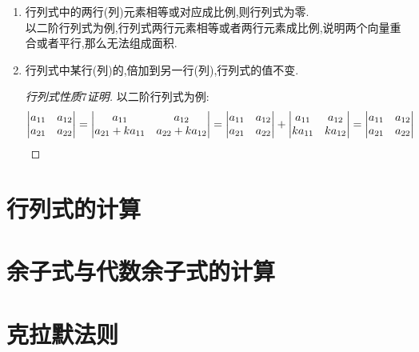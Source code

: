 \documentclass[8pt a4paper, oneside, UTF8]{ctexbook}
\begin{document}
\begin{sloppypar}
\begin{enumerate}
        \item 行列式中的两行(列)元素相等或对应成比例,则行列式为零.\\
        以二阶行列式为例,行列式两行元素相等或者两行元素成比例,说明两个向量重合或者平行,那么无法组成面积.
        \item 行列式中某行(列)的,倍加到另一行(列),行列式的值不变.
        \begin{proof}[行列式性质$7$证明]
            以二阶行列式为例:
            $$
            \begin{vmatrix}
                a_{11} & a_{12}\\
                a_{21} & a_{22}
            \end{vmatrix}=\begin{vmatrix}
                a_{11} & a_{12}\\
                a_{21}+ka_{11} & a_{22}+ka_{12}
            \end{vmatrix}=\begin{vmatrix}
                a_{11} & a_{12}\\
                a_{21} & a_{22}
            \end{vmatrix}+\begin{vmatrix}
                a_{11} & a_{12}\\
                ka_{11} & ka_{12} 
            \end{vmatrix}=\begin{vmatrix}
                a_{11} & a_{12}\\
                a_{21} & a_{22}
            \end{vmatrix}\\
            $$
        \end{proof}
    \end{enumerate}
    \section{行列式的计算}
    
    \section{余子式与代数余子式的计算}
    \section{克拉默法则}
    
        \ifx\allfiles\undefined
    \end{sloppypar}
\end{document}
